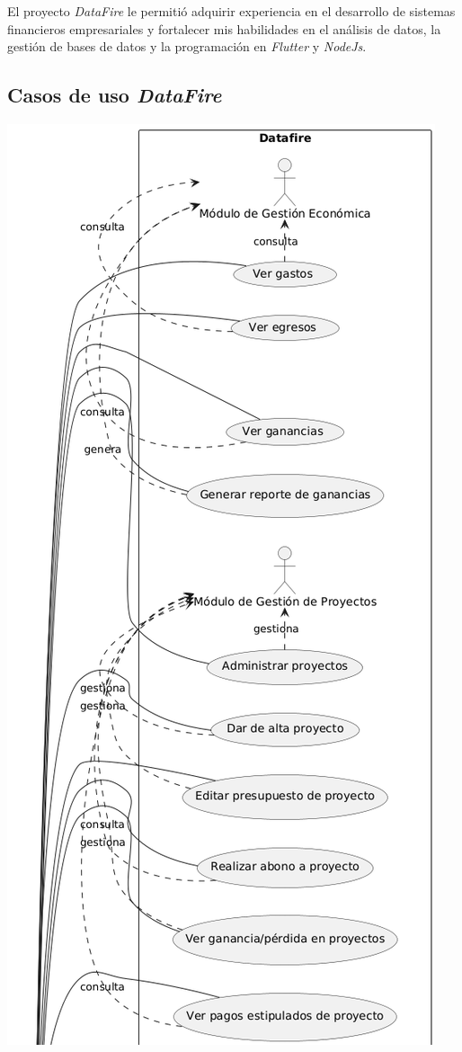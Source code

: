 \documentclass[protocolo.tex]{subfiles}
\begin{document}
El proyecto \textit{DataFire} le permitió adquirir experiencia en el desarrollo de sistemas financieros empresariales y fortalecer mis habilidades en el análisis de datos, la gestión de bases de datos y la programación en \textit{Flutter} y \textit{NodeJs}.

\subsection{Casos de uso \textit{DataFire} }


\includegraphics[scale=0.7]{Imagenes/datafirept1.png}
\end{document}
